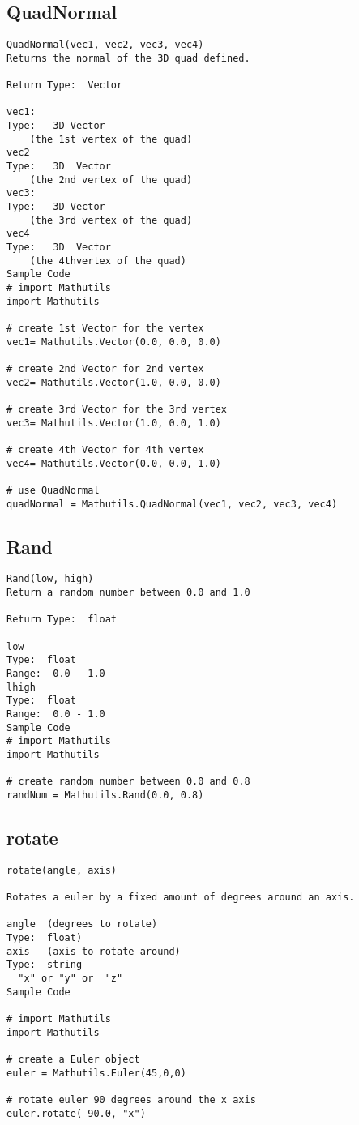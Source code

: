 \subsection{QuadNormal}
\begin{verbatim}
QuadNormal(vec1, vec2, vec3, vec4)
Returns the normal of the 3D quad defined.

Return Type:  Vector

vec1:
Type:   3D Vector  
    (the 1st vertex of the quad)
vec2
Type:   3D  Vector
    (the 2nd vertex of the quad)
vec3:
Type:   3D Vector  
    (the 3rd vertex of the quad)
vec4
Type:   3D  Vector
    (the 4thvertex of the quad)
Sample Code
# import Mathutils
import Mathutils

# create 1st Vector for the vertex
vec1= Mathutils.Vector(0.0, 0.0, 0.0)

# create 2nd Vector for 2nd vertex
vec2= Mathutils.Vector(1.0, 0.0, 0.0)

# create 3rd Vector for the 3rd vertex
vec3= Mathutils.Vector(1.0, 0.0, 1.0)

# create 4th Vector for 4th vertex
vec4= Mathutils.Vector(0.0, 0.0, 1.0)

# use QuadNormal
quadNormal = Mathutils.QuadNormal(vec1, vec2, vec3, vec4)
\end{verbatim}

\subsection{Rand}
\begin{verbatim}
Rand(low, high)
Return a random number between 0.0 and 1.0

Return Type:  float

low
Type:  float
Range:  0.0 - 1.0
lhigh
Type:  float
Range:  0.0 - 1.0
Sample Code
# import Mathutils
import Mathutils

# create random number between 0.0 and 0.8
randNum = Mathutils.Rand(0.0, 0.8)
\end{verbatim}


\subsection{rotate}
\begin{verbatim}
rotate(angle, axis)

Rotates a euler by a fixed amount of degrees around an axis.

angle  (degrees to rotate)
Type:  float) 
axis   (axis to rotate around)
Type:  string
  "x" or "y" or  "z"
Sample Code

# import Mathutils
import Mathutils

# create a Euler object
euler = Mathutils.Euler(45,0,0)

# rotate euler 90 degrees around the x axis
euler.rotate( 90.0, "x")
\end{verbatim}


